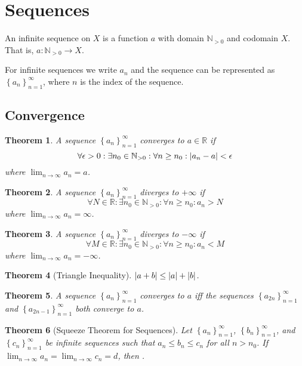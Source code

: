 \documentclass{article}
\theoremstyle{plain}
\newtheorem{theorem}{Theorem}[section]
\numberwithin{theorem}{section}
\theoremstyle{definition}
\numberwithin{definition}{section}
\theoremstyle{remark}
\numberwithin{note}{section}
\newcommand*{\N}{\mathbb{N}}
\newcommand*{\R}{\mathbb{R}}
\begin{document}
\section{Sequences}
An infinite sequence on $X$ is a function $a$ with domain $\N_{> 0}$ and codomain $X$. That is, $a:\N_{> 0}\rightarrow X$.

For infinite sequences we write $a_n$ and the sequence can be represented as $\left\{a_n\right\}_{n=1}^\infty$, where $n$ is the index of the sequence.
%
\subsection{Convergence}
\begin{theorem}
	A sequence $\left\{a_n\right\}_{n=1}^\infty$ converges to $a\in \R$ if
	\begin{equation*}
		\forall \epsilon > 0 : \exists n_0 \in \N_{> 0}:\forall n \geq n_0 : \abs{a_n - a} < \epsilon
	\end{equation*}
	where $\lim_{n \rightarrow \infty}a_n = a$.
\end{theorem}
%
\begin{theorem}
	A sequence $\left\{a_n\right\}_{n=1}^\infty$ diverges to $+\infty$ if
	\begin{equation*}
		\forall N \in \R : \exists n_0 \in \N_{> 0}:\forall n \geq n_0 : a_n > N
	\end{equation*}
	where $\lim_{n \rightarrow \infty}a_n = \infty$.
\end{theorem}
%
\begin{theorem}
	A sequence $\left\{a_n\right\}_{n=1}^\infty$ diverges to $-\infty$ if
	\begin{equation*}
		\forall M \in \R : \exists n_0 \in \N_{> 0}:\forall n \geq n_0 : a_n < M
	\end{equation*}
	where $\lim_{n \rightarrow \infty}a_n = -\infty$.
\end{theorem}
%
\begin{theorem}[Triangle Inequality]
	$\abs{a+b}\leq\abs{a}+\abs{b}$.
\end{theorem}
%
\begin{theorem}
	A sequence $\left\{ a_n \right\}_{n=1}^\infty$ converges to $a$ iff the sequences $\left\{ a_{2n} \right\}_{n=1}^\infty$ and $\left\{ a_{2n-1} \right\}_{n=1}^\infty$ both converge to $a$.
\end{theorem}
%
\begin{theorem}[Squeeze Theorem for Sequences]
	Let $\left\{ a_n \right\}_{n=1}^\infty$, $\left\{ b_n \right\}_{n=1}^\infty$, and $\left\{ c_n \right\}_{n=1}^\infty$ be infinite sequences such that $a_n \leq b_n \leq c_n$ for all $n>n_0$. If $\lim_{n\rightarrow\infty}a_n=\lim_{n\rightarrow\infty}c_n=d$, then .
\end{theorem}
%
\end{document}
